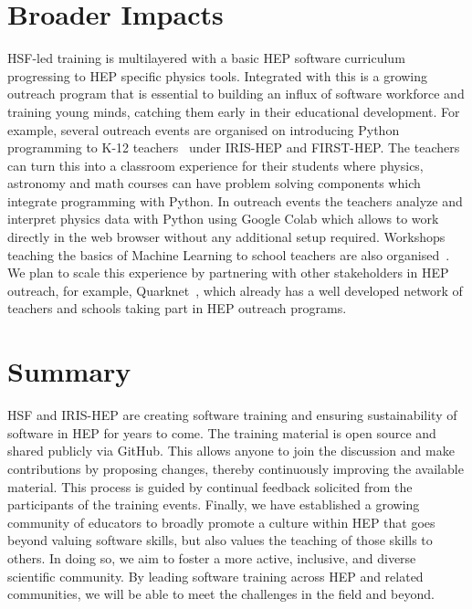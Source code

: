 \documentclass[twocolumn]{svjour3}          %
\begin{document}
\section{Broader Impacts}\label{sec:BroaderImpacts}

HSF-led training is multilayered with a basic HEP software curriculum progressing to HEP specific physics tools. Integrated with this is a growing outreach program that is essential to building an influx of software workforce and training young minds, catching them early in their educational development. For example, several outreach events are organised on introducing Python programming to K-12 teachers~\cite{HSF-training-DA-STEM-PR-2020} under IRIS-HEP and FIRST-HEP. The teachers can turn this into a classroom experience for their students where physics, astronomy and math courses can have problem solving components which integrate programming with Python. In outreach events the teachers analyze and interpret physics data with Python using Google Colab which allows to work directly in the web browser without any additional setup required. Workshops teaching the basics of Machine Learning to school teachers are also organised~\cite{HSF-training-ML-STEM-PR-2021}. We plan to scale this experience by partnering with other stakeholders in HEP outreach, for example, Quarknet~\cite{quarknet}, which already has a well developed network of teachers and schools taking part in HEP outreach programs.

\section{Summary}\label{sec:Summary}

HSF and IRIS-HEP are creating software training and ensuring sustainability of software in HEP for years to come. The training material is open source and shared publicly via GitHub. This allows anyone to join the discussion and make contributions by proposing changes, thereby continuously improving the available material.
This process is guided by continual feedback solicited from the participants of the training events. Finally, we have established a growing community of educators to broadly promote a culture within HEP that goes beyond valuing software skills, but also values the teaching of those skills to others. In doing so, we aim to foster a more active, inclusive, and diverse scientific community.  By leading software training across HEP and related communities, we will be able to meet the challenges in the field and beyond.
\end{document}
